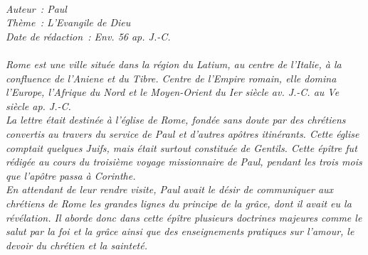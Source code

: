 \BFont
\noindent\hrulefill
{\footnotesize
\textit{
\bigskip
{\centering{}
\\Auteur~: Paul
\\Thème~: L'Evangile de Dieu
\\Date de rédaction~: Env. 56 ap. J.-C.\\}
}
\textit{
\\Rome est une ville située dans la région du Latium, au centre de l'Italie, à la confluence de l'Aniene et du Tibre. Centre de l'Empire romain, elle domina l'Europe, l'Afrique du Nord et le Moyen-Orient du Ier siècle av. J.-C. au Ve siècle ap. J.-C.
\\La lettre était destinée à l'église de Rome, fondée sans doute par des chrétiens convertis au travers du service de Paul et d'autres apôtres itinérants. Cette église comptait quelques Juifs, mais était surtout constituée de Gentils. Cette épître fut rédigée au cours du troisième voyage missionnaire de Paul, pendant les trois mois que l'apôtre passa à Corinthe.
\\En attendant de leur rendre visite, Paul avait le désir de communiquer aux chrétiens de Rome les grandes lignes du principe de la grâce, dont il avait eu la révélation. Il aborde donc dans cette épître plusieurs doctrines majeures comme le salut par la foi et la grâce ainsi que des enseignements pratiques sur l'amour, le devoir du chrétien et la sainteté.\bigskip
}
}
\par\nobreak\noindent\hrulefill
